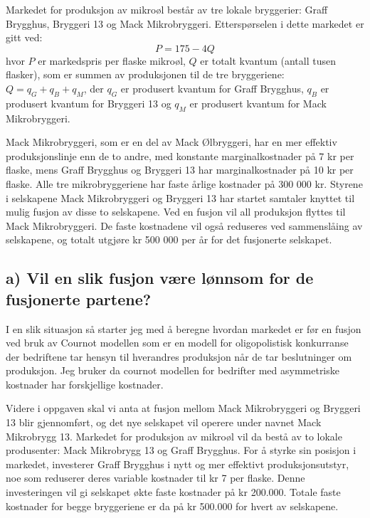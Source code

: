 \documentclass[
  12pt,
  a4paper,
  DIV=11,
  numbers=noendperiod]{scrartcl}
\begin{document}
Markedet for produksjon av mikroøl består av tre lokale bryggerier:
Graff Brygghus, Bryggeri 13 og Mack Mikrobryggeri. Etterspørselen i
dette markedet er gitt ved: \[
P = 175-4Q
\] hvor \(P\) er markedspris per flaske mikroøl, \(Q\) er totalt kvantum
(antall tusen flasker), som er summen av produksjonen til de tre
bryggeriene: \(Q = q_G + q_B + q_M\), der \(q_G\) er produsert kvantum
for Graff Brygghus, \(q_B\) er produsert kvantum for Bryggeri 13 og
\(q_M\) er produsert kvantum for Mack Mikrobryggeri.

Mack Mikrobryggeri, som er en del av Mack Ølbryggeri, har en mer
effektiv produksjonslinje enn de to andre, med konstante
marginalkostnader på 7 kr per flaske, mens Graff Brygghus og Bryggeri 13
har marginalkostnader på 10 kr per flaske. Alle tre mikrobryggeriene har
faste årlige kostnader på 300 000 kr. Styrene i selskapene Mack
Mikrobryggeri og Bryggeri 13 har startet samtaler knyttet til mulig
fusjon av disse to selskapene. Ved en fusjon vil all produksjon flyttes
til Mack Mikrobryggeri. De faste kostnadene vil også reduseres ved
sammenslåing av selskapene, og totalt utgjøre kr 500 000 per år for det
fusjonerte selskapet.

\subsection{a) Vil en slik fusjon være lønnsom for de fusjonerte
partene?}\label{a-vil-en-slik-fusjon-vuxe6re-luxf8nnsom-for-de-fusjonerte-partene}

I en slik situasjon så starter jeg med å beregne hvordan markedet er før
en fusjon ved bruk av Cournot modellen som er en modell for
oligopolistisk konkurranse der bedriftene tar hensyn til hverandres
produksjon når de tar beslutninger om produksjon. Jeg bruker da cournot
modellen for bedrifter med asymmetriske kostnader har forskjellige
kostnader.

Videre i oppgaven skal vi anta at fusjon mellom Mack Mikrobryggeri og
Bryggeri 13 blir gjennomført, og det nye selskapet vil operere under
navnet Mack Mikrobrygg 13. Markedet for produksjon av mikroøl vil da
bestå av to lokale produsenter: Mack Mikrobrygg 13 og Graff Brygghus.
For å styrke sin posisjon i markedet, investerer Graff Brygghus i nytt
og mer effektivt produksjonsutstyr, noe som reduserer deres variable
kostnader til kr 7 per flaske. Denne investeringen vil gi selskapet økte
faste kostnader på kr 200.000. Totale faste kostnader for begge
bryggeriene er da på kr 500.000 for hvert av selskapene.
\end{document}
